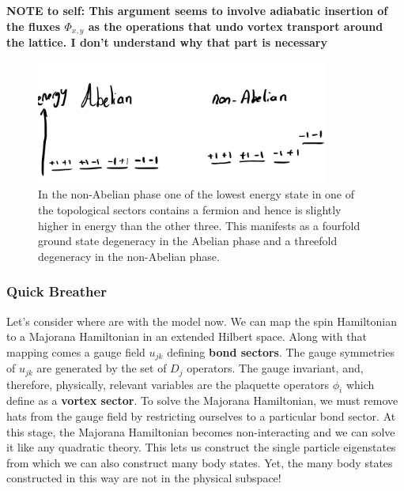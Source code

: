 \textbf{NOTE to self: This argument seems to involve adiabatic insertion of the fluxes \(\Phi_{x,y}\) as the operations that undo vortex transport around the lattice. I don't understand why that part is necessary}

\begin{figure}
\hypertarget{fig:threefold_degeneracy}{%
\centering
\includegraphics[width=0.86\textwidth,height=\textheight]{figure_code/amk_chapter/threefold_degeneracy.png}
\caption{In the non-Abelian phase one of the lowest energy state in one of the topological sectors contains a fermion and hence is slightly higher in energy than the other three. This manifests as a fourfold ground state degeneracy in the Abelian phase and a threefold degeneracy in the non-Abelian phase.}\label{fig:threefold_degeneracy}
}
\end{figure}

\hypertarget{quick-breather}{%
\subsubsection{Quick Breather}\label{quick-breather}}

Let's consider where are with the model now. We can map the spin Hamiltonian to a Majorana Hamiltonian in an extended Hilbert space. Along with that mapping comes a gauge field \(u_{jk}\) defining \textbf{bond sectors}. The gauge symmetries of \(u_{jk}\) are generated by the set of \(D_j\) operators. The gauge invariant, and, therefore, physically, relevant variables are the plaquette operators \(\phi_i\) which define as a \textbf{vortex sector}. To solve the Majorana Hamiltonian, we must remove hats from the gauge field by restricting ourselves to a particular bond sector. At this stage, the Majorana Hamiltonian becomes non-interacting and we can solve it like any quadratic theory. This lets us construct the single particle eigenstates from which we can also construct many body states. Yet, the many body states constructed in this way are not in the physical subspace!

